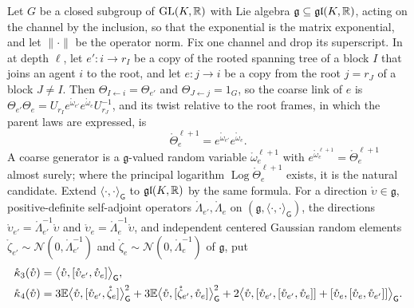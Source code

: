 Let \(G\) be a closed subgroup of \(\mathrm{GL}(K,\mathbb R)\) with Lie algebra \(\mathfrak g\subseteq\mathfrak{gl}(K,\mathbb R)\),
acting on the channel by the inclusion, so that the exponential is the matrix exponential, and let
\(\lVert\cdot\rVert\) be the operator norm. Fix one channel and drop its superscript. In
 at depth \(\ell\), let \(e':i\to r_I\) be a copy of the rooted spanning
tree of a block \(I\) that joins an agent \(i\) to the root, and let \(e:j\to i\) be a copy from the root
\(j=r_J\) of a block \(J\neq I\). Then \(\Theta_{I\leftarrow i}=\Theta_{e'}\) and \(\Theta_{J\leftarrow j}=1_G\),
so the coarse link of \(e\) is \(\Theta_{e'}\Theta_e=U_{r_I}e^{\mathring\omega_{e'}}e^{\mathring\omega_e}U_{r_J}^{-1}\),
and its twist relative to the root frames, in which the parent laws are expressed, is
\begin{equation}
\mathring\Theta^{\ell+1}_e=e^{\mathring\omega_{e'}}e^{\mathring\omega_e}.
\label{eq:link-coarse-twist}
\end{equation}
A coarse generator is a \(\mathfrak g\)-valued random variable \(\mathring\omega^{\ell+1}_e\) with
\(e^{\mathring\omega^{\ell+1}_e}=\mathring\Theta^{\ell+1}_e\) almost surely; where the principal logarithm
\(\operatorname{Log}\mathring\Theta^{\ell+1}_e\) exists, it is the natural candidate. Extend
\(\langle\cdot,\cdot\rangle_{\mathsf G}\) to \(\mathfrak{gl}(K,\mathbb R)\) by the same formula. For a direction
\(\mathring\upsilon\in\mathfrak g\), positive-definite self-adjoint operators
\(\mathring\Lambda_{e'},\mathring\Lambda_e\) on \((\mathfrak g,\langle\cdot,\cdot\rangle_{\mathsf G})\), the
directions \(\mathring\upsilon_{e'}=\mathring\Lambda_{e'}^{-1}\mathring\upsilon\) and
\(\mathring\upsilon_e=\mathring\Lambda_e^{-1}\mathring\upsilon\), and independent centered Gaussian random
elements \(\mathring\zeta_{e'}\sim\mathcal N(0,\mathring\Lambda_{e'}^{-1})\) and
\(\mathring\zeta_e\sim\mathcal N(0,\mathring\Lambda_e^{-1})\) of \(\mathfrak g\), put
\begin{equation}
\begin{aligned}
\mathring\kappa_3(\mathring\upsilon)
={}&\bigl\langle\mathring\upsilon,[\mathring\upsilon_{e'},\mathring\upsilon_e]\bigr\rangle_{\mathsf G},\\
\mathring\kappa_4(\mathring\upsilon)
={}&3\mathbb E\bigl\langle\mathring\upsilon,[\mathring\upsilon_{e'},\mathring\zeta_e]\bigr\rangle_{\mathsf G}^2
+3\mathbb E\bigl\langle\mathring\upsilon,[\mathring\zeta_{e'},\mathring\upsilon_e]\bigr\rangle_{\mathsf G}^2
+2\bigl\langle\mathring\upsilon,[\mathring\upsilon_{e'},[\mathring\upsilon_{e'},\mathring\upsilon_e]]
+[\mathring\upsilon_e,[\mathring\upsilon_e,\mathring\upsilon_{e'}]]\bigr\rangle_{\mathsf G}.
\end{aligned}
\label{eq:link-coarse-cumulant-forms}
\end{equation}

